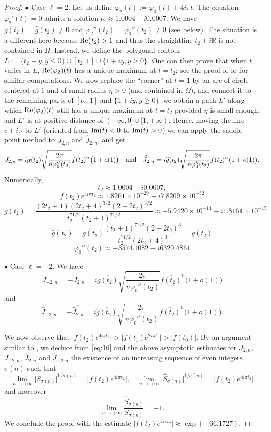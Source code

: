 \documentclass[reqno,12pt]{article}
\theoremstyle{remark}
\begin{document}
\begin{proof}
\noindent $\bullet$ Case $\ell=2$. Let us define  $\varphi_2(t):=\varphi_0(t)+4i\pi t$. The equation $\varphi_2'(t)=0$ admits a solution 
$t_2\approx 1.0004-i0.0007$. 
We have $g(t_2)=\widehat{g}(t_2)\neq 0$ and $\varphi_2''(t_2)=\varphi_0''(t_2)\neq 0$ (see below). 
The situation is a different here because $\textup{Re}(t_2)>1$ and thus the straightline $t_2+i\mathbb R$ is not contained in $\Omega$. Instead, we define the polygonal contour $L:=\{t_2+y, y\le 0\}\cup [t_2,1] \cup \{1+iy, y\ge 0\}$. One can then prove that when $t$ varies in $L$, $\textup{Re}(\varphi_2)(t) $ has a unique maximum at $t=t_2$; see the proof of \cite[Lemma 10]{firi} or \cite{zud3} for similar computations. We now replace the ``corner'' at $t=1$ by an arc of circle centered at $1$ and of small radius $\eta>0$ (and contained in $\Omega$), and connect it to the remaining parts of $[t_2,1]$ and $\{1+iy, y\ge 0\}$: we obtain a path $L'$ along which $\textup{Re}(\varphi_2)(t) $ still has a unique maximum at $t=t_2$ provided $\eta$ is small enough, and $L'$ is at positive distance of $(-\infty,0] \cup [1,+\infty)$.
Hence, moving the line $c+i\mathbb R$ to $L'$ (oriented from $\textup{Im}(t)<0$ to $\textup{Im}(t)>0$) we can apply the saddle point method to $J_{2,n}$ and $\widehat{J}_{2,n}$, and get
$$
J_{2,n}= ig(t_2) \sqrt{\frac{2\pi}{n\varphi_0''(t_2)} } f(t_2)^n \big(1+o(1)\big)\quad \textup{and} \quad 
\widehat{J}_{2,n}= i \widehat{g}(t_2) \sqrt{\frac{2\pi}{n\varphi_0''(t_2)} } f(t_2)^n \big(1+o(1)\big).
$$
Numerically,
$$
t_2\approx 1.0004-i0.0007,
$$
$$f(t_2)e^{4i\pi t_2}\approx 1.8261 \times 10^{-29}-i7.8209 \times 10^{-32}
$$
$$
g(t_2)=\frac{(2t_2+1)(2t_2+4)^{3/2}(2-2t_2)^{3/2}}
{t_2^{71/2}(t_2+1)^{71/2}}\approx -5.9420 \times 10^{-14}-i1.8161 \times 10^{-15}
$$
$$
\widehat{g}(t_2)=g(t_2)\frac{(t_2+1)^{71/2}(2-2t_2)^3}{t_2^{71/2}(2t_2+4)^3}=g(t_2)
$$
$$
\varphi_0''(t_2)\approx -3574.1082-i6320.4861
$$

\noindent $\bullet$ Case $\ell=-2$. We have 
$$
J_{-2,n}= -\overline{J_{2,n}}=i\overline{g(t_{2})} \sqrt{\frac{2\pi}{n\overline{\varphi_{0}''(t_{2})}} } \overline{f(t_{2})}^n \big(1+o(1)\big)
$$
and 
$$
\widehat{J}_{-2,n}= -\overline{\widehat{J}_{2,n}}=i \overline{\widehat{g}(t_{2})} \sqrt{\frac{2\pi}{n\overline{\varphi_{0}''(t_{2})}} } \overline{f(t_{2})}^n \big(1+o(1)\big).
$$

We now observe that $\vert f(t_2)e^{4i\pi t_2}\vert > \vert f(t_1)e^{2i\pi t_1}\vert > \vert f(t_0)\vert$. By an argument similar to \cite[Lemma 5]{ri2},  we deduce from \eqref{eq:16} and the above asymptotic estimates for $J_{2,n}$, $J_{-2,n}$, $\widehat{J}_{2,n}$ and $\widehat{J}_{-2,n}$ the existence of an increasing sequence of even integers $\sigma(n)$ such that 
$$
\lim_{n\to +\infty} \vert S_{\sigma(n)}\vert^{1/\sigma(n)}= \vert f(t_2)e^{4i\pi t_2}\vert, \quad 
\lim_{n\to +\infty} \vert \widehat{S}_{\sigma(n)}\vert^{1/\sigma(n)}= \vert f(t_2)e^{4i\pi t_2}\vert
$$
and moreover
$$
\lim_{n\to +\infty} \frac{
\widehat{S}_{\sigma(n)}}{S_{\sigma(n)}}=-1.
$$
We conclude the proof with the estimate 
$
\vert f(t_2)e^{4i\pi t_2}\vert \approx \exp(-66.1727).
$
\end{proof}
\end{document}
